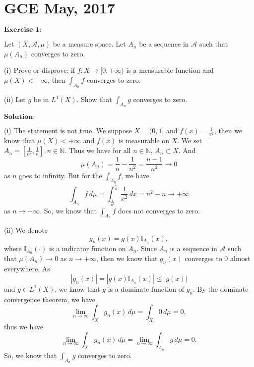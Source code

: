 \documentclass[12pt]{article}
\begin{document}
\newpage

\section{GCE May, 2017}

$\textbf{Exercise 1:}$

Let $(X, \mathcal{A}, \mu)$ be a measure space. Let $A_{n}$ be a sequence in $\mathcal{A}$ such that $\mu(A_{n})$ converges to zero.

(i) Prove or disprove: if $f : X \rightarrow [0, + \infty)$ is a measurable function and $\mu(X) < + \infty$, then $\int_{A_{n}}^{} f$ converges to zero.

(ii) Let $g$ be in $L^{1}(X)$. Show that $\int_{A_{n}}^{} g$ converges to zero.

\vspace{8pt}

$\textbf{Solution:}$

(i) The statement is not true. We suppose $X = (0, 1]$ and $f(x) = \frac{1}{x^{2}}$, then we know that $\mu(X) < + \infty$ and $f(x)$ is measurable on $X$. We set $A_{n} = [\frac{1}{n^{2}}, \frac{1}{n}], n \in \mathbb{N}$. Thus we have for all $n \in \mathbb{N}$, $A_{n} \subset X$. And
\begin{equation*}
   \mu(A_{n}) = \frac{1}{n} - \frac{1}{n^{2}} = \frac{n - 1}{n^{2}} \to 0
\end{equation*}
as $n$ goes to infinity. But for the $\int_{A_{n}}^{} f$, we have
\begin{equation*}
   \int_{A_{n}}^{} f \, d \mu = \int_{\frac{1}{n^{2}}}^{\frac{1}{n}} \frac{1}{x^{2}} \, d x = n^{2} - n \to + \infty
\end{equation*}
as $n \to + \infty$. So, we know that $\int_{A_{n}}^{} f$ does not converges to zero.

\vspace{8pt}

(ii) We denote
\begin{equation*}
   g_{n}(x) = g(x) \mathbb{I}_{A_{n}} (x),
\end{equation*}
where $\mathbb{I}_{A_{n}} (\cdot)$ is a indicator function on $A_{n}$. Since $A_{n}$ is a sequence in $\mathcal{A}$ such that $\mu(A_{n}) \to 0$ as $n \to + \infty$, then we know that $g_{n}(x)$ converges to $0$ almost everywhere. As
\begin{equation*}
   |g_{n}(x)| = |g(x) \mathbb{I}_{A_{n}} (x)| \leq |g(x)|
\end{equation*}
and $g \in L^{1}(X)$, we know that $g$ is a dominate function of $g_{n}$. By the dominate convergence theorem, we have
\begin{equation*}
   \lim_{n \to \infty} \int_{X}^{} g_{n}(x) \, d \mu = \int_{X}^{} 0 \, d \mu = 0,
\end{equation*}
thus we have
\begin{equation*}
   \lim_{n \to \infty} \int_{X}^{} g_{n}(x) \, d \mu = \lim_{n \to \infty} \int_{A_{n}}^{} g \, d \mu = 0.
\end{equation*}
So, we know that $\int_{A_{n}}^{} g$ converges to zero.
\end{document}
